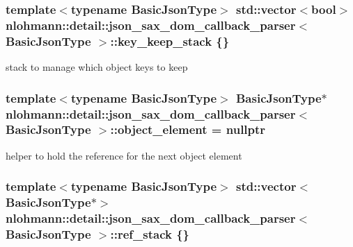 \subsubsection[{\texorpdfstring{key\+\_\+keep\+\_\+stack}{key_keep_stack}}]{\setlength{\rightskip}{0pt plus 5cm}template$<$typename Basic\+Json\+Type$>$ std\+::vector$<$bool$>$ {\bf nlohmann\+::detail\+::json\+\_\+sax\+\_\+dom\+\_\+callback\+\_\+parser}$<$ Basic\+Json\+Type $>$\+::key\+\_\+keep\+\_\+stack \{\}\hspace{0.3cm}{\ttfamily [private]}}\hypertarget{classnlohmann_1_1detail_1_1json__sax__dom__callback__parser_a8f0e96e8bc4f692169024105693f5706}{}\label{classnlohmann_1_1detail_1_1json__sax__dom__callback__parser_a8f0e96e8bc4f692169024105693f5706}


stack to manage which object keys to keep 

\subsubsection[{\texorpdfstring{object\+\_\+element}{object_element}}]{\setlength{\rightskip}{0pt plus 5cm}template$<$typename Basic\+Json\+Type$>$ Basic\+Json\+Type$\ast$ {\bf nlohmann\+::detail\+::json\+\_\+sax\+\_\+dom\+\_\+callback\+\_\+parser}$<$ Basic\+Json\+Type $>$\+::object\+\_\+element = nullptr\hspace{0.3cm}{\ttfamily [private]}}\hypertarget{classnlohmann_1_1detail_1_1json__sax__dom__callback__parser_a2a8adecd936ba6ec187f1216241b508f}{}\label{classnlohmann_1_1detail_1_1json__sax__dom__callback__parser_a2a8adecd936ba6ec187f1216241b508f}


helper to hold the reference for the next object element 

\subsubsection[{\texorpdfstring{ref\+\_\+stack}{ref_stack}}]{\setlength{\rightskip}{0pt plus 5cm}template$<$typename Basic\+Json\+Type$>$ std\+::vector$<$Basic\+Json\+Type$\ast$$>$ {\bf nlohmann\+::detail\+::json\+\_\+sax\+\_\+dom\+\_\+callback\+\_\+parser}$<$ Basic\+Json\+Type $>$\+::ref\+\_\+stack \{\}\hspace{0.3cm}{\ttfamily [private]}}\hypertarget{classnlohmann_1_1detail_1_1json__sax__dom__callback__parser_a82a0e49479660b9903597e1ef55c6601}{}\label{classnlohmann_1_1detail_1_1json__sax__dom__callback__parser_a82a0e49479660b9903597e1ef55c6601}



